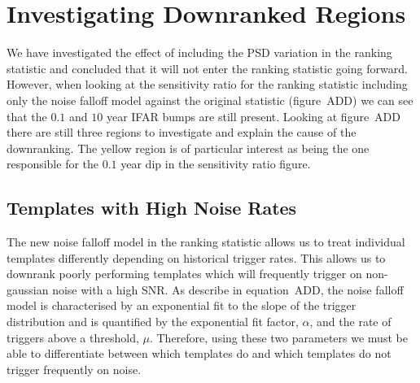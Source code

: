 \section{\label{pycbclive-investigating-regions}Investigating Downranked Regions}

We have investigated the effect of including the PSD variation in the ranking statistic and concluded that it will not enter the ranking statistic going forward. However, when looking at the sensitivity ratio for the ranking statistic including only the noise falloff model against the original statistic (figure~ADD) we can see that the $0.1$ and $10$ year IFAR bumps are still present.
%
%
Looking at figure~ADD there are still three regions to investigate and explain the cause of the downranking. The yellow region is of particular interest as being the one responsible for the $0.1$ year dip in the sensitivity ratio figure.


\subsection{\label{sec:pycbclive-poor-temp-fits}Templates with High Noise Rates}


The new noise falloff model in the ranking statistic allows us to treat individual templates differently depending on historical trigger rates. This allows us to downrank poorly performing templates which will frequently trigger on non-gaussian noise with a high SNR. As describe in equation~ADD, the noise falloff model is characterised by an exponential fit to the slope of the trigger distribution and is quantified by the exponential fit factor, $\alpha$, and the rate of triggers above a threshold, $\mu$. Therefore, using these two parameters we must be able to differentiate between which templates do and which templates do not trigger frequently on noise.

